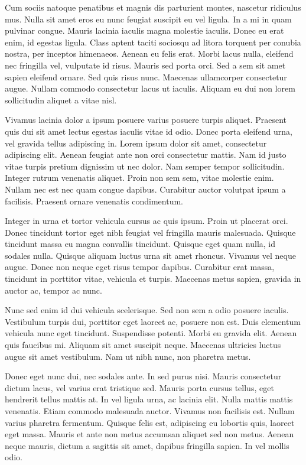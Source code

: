Cum sociis natoque penatibus et magnis dis parturient montes, nascetur ridiculus mus.
Nulla sit amet eros eu nunc feugiat suscipit eu vel ligula.
In a mi in quam pulvinar congue.
Mauris lacinia iaculis magna molestie iaculis.
Donec eu erat enim, id egestas ligula.
Class aptent taciti sociosqu ad litora torquent per conubia nostra, per inceptos himenaeos.
Aenean eu felis erat.
Morbi lacus nulla, eleifend nec fringilla vel, vulputate id risus.
Mauris sed porta orci.
Sed a sem sit amet sapien eleifend ornare.
Sed quis risus nunc.
Maecenas ullamcorper consectetur augue.
Nullam commodo consectetur lacus ut iaculis.
Aliquam eu dui non lorem sollicitudin aliquet a vitae nisl.

Vivamus lacinia dolor a ipsum posuere varius posuere turpis aliquet.
Praesent quis dui sit amet lectus egestas iaculis vitae id odio.
Donec porta eleifend urna, vel gravida tellus adipiscing in.
Lorem ipsum dolor sit amet, consectetur adipiscing elit.
Aenean feugiat ante non orci consectetur mattis.
Nam id justo vitae turpis pretium dignissim ut nec dolor.
Nam semper tempor sollicitudin.
Integer rutrum venenatis aliquet.
Proin non sem sem, vitae molestie enim.
Nullam nec est nec quam congue dapibus.
Curabitur auctor volutpat ipsum a facilisis.
Praesent ornare venenatis condimentum.

Integer in urna et tortor vehicula cursus ac quis ipsum.
Proin ut placerat orci.
Donec tincidunt tortor eget nibh feugiat vel fringilla mauris malesuada.
Quisque tincidunt massa eu magna convallis tincidunt.
Quisque eget quam nulla, id sodales nulla.
Quisque aliquam luctus urna sit amet rhoncus.
Vivamus vel neque augue.
Donec non neque eget risus tempor dapibus.
Curabitur erat massa, tincidunt in porttitor vitae, vehicula et turpis.
Maecenas metus sapien, gravida in auctor ac, tempor ac nunc.

Nunc sed enim id dui vehicula scelerisque.
Sed non sem a odio posuere iaculis.
Vestibulum turpis dui, porttitor eget laoreet ac, posuere non est.
Duis elementum vehicula nunc eget tincidunt.
Suspendisse potenti.
Morbi eu gravida elit.
Aenean quis faucibus mi.
Aliquam sit amet suscipit neque.
Maecenas ultricies luctus augue sit amet vestibulum.
Nam ut nibh nunc, non pharetra metus.

Donec eget nunc dui, nec sodales ante.
In sed purus nisi.
Mauris consectetur dictum lacus, vel varius erat tristique sed.
Mauris porta cursus tellus, eget hendrerit tellus mattis at.
In vel ligula urna, ac lacinia elit.
Nulla mattis mattis venenatis.
Etiam commodo malesuada auctor.
Vivamus non facilisis est.
Nullam varius pharetra fermentum.
Quisque felis est, adipiscing eu lobortis quis, laoreet eget massa.
Mauris et ante non metus accumsan aliquet sed non metus.
Aenean neque mauris, dictum a sagittis sit amet, dapibus fringilla sapien.
In vel mollis odio.

